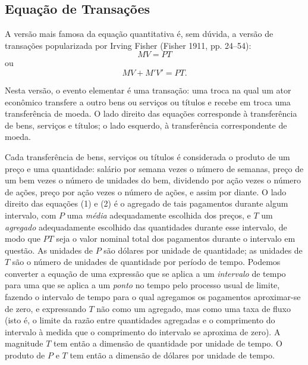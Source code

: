 \documentclass[12pt]{article}
\begin{document}
\subsection{Equação de Transações}

A versão mais famosa da equação quantitativa é, sem dúvida, a versão de transações popularizada por Irving Fisher (Fisher 1911, pp. 24–54):
\begin{equation}
MV = PT
\end{equation}
ou
\begin{equation}
MV + M'V' = PT.
\end{equation}

Nesta versão, o evento elementar é uma transação: uma troca na qual um ator econômico transfere a outro bens ou serviços ou títulos e recebe em troca uma transferência de moeda. O lado direito das equações corresponde à transferência de bens, serviços e títulos; o lado esquerdo, à transferência correspondente de moeda.

Cada transferência de bens, serviços ou títulos é considerada o produto de um preço e uma quantidade: salário por semana vezes o número de semanas, preço de um bem vezes o número de unidades do bem, dividendo por ação vezes o número de ações, preço por ação vezes o número de ações, e assim por diante. O lado direito das equações (1) e (2) é o agregado de tais pagamentos durante algum intervalo, com $P$ uma \textit{média} adequadamente escolhida dos preços, e $T$ um \textit{agregado} adequadamente escolhido das quantidades durante esse intervalo, de modo que $PT$ seja o valor nominal total dos pagamentos durante o intervalo em questão. As unidades de $P$ são dólares por unidade de quantidade; as unidades de $T$ são o número de unidades de quantidade por período de tempo. Podemos converter a equação de uma expressão que se aplica a um \textit{intervalo} de tempo para uma que se aplica a um \textit{ponto} no tempo pelo processo usual de limite, fazendo o intervalo de tempo para o qual agregamos os pagamentos aproximar-se de zero, e expressando $T$ não como um agregado, mas como uma taxa de fluxo (isto é, o limite da razão entre quantidades agregadas e o comprimento do intervalo à medida que o comprimento do intervalo se aproxima de zero). A magnitude $T$ tem então a dimensão de quantidade por unidade de tempo. O produto de $P$ e $T$ tem então a dimensão de dólares por unidade de tempo.
\end{document}
